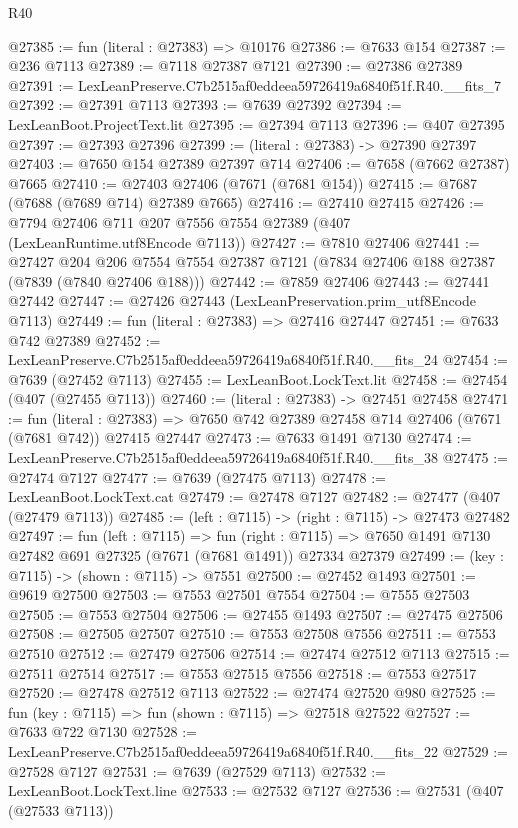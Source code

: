 \begin{lexlean}{R40}
\begin{coremodule}
@27385 := fun (literal : @27383) => @10176
@27386 := @7633 @154
@27387 := @236 @7113
@27389 := @7118 @27387 @7121
@27390 := @27386 @27389
@27391 := LexLeanPreserve.C7b2515af0eddeea59726419a6840f51f.R40.__fits_7
@27392 := @27391 @7113
@27393 := @7639 @27392
@27394 := LexLeanBoot.ProjectText.lit
@27395 := @27394 @7113
@27396 := @407 @27395
@27397 := @27393 @27396
@27399 := (literal : @27383) -> @27390 @27397
@27403 := @7650 @154 @27389 @27397 @714
@27406 := @7658 (@7662 @27387) @7665
@27410 := @27403 @27406 (@7671 (@7681 @154))
@27415 := @7687 (@7688 (@7689 @714) @27389 @7665)
@27416 := @27410 @27415
@27426 := @7794 @27406 @711 @207 @7556 @7554 @27389 (@407 (LexLeanRuntime.utf8Encode @7113))
@27427 := @7810 @27406
@27441 := @27427
    @204
    @206
    @7554
    @7554
    @27387
    @7121
    (@7834 @27406 @188 @27387 (@7839 (@7840 @27406 @188)))
@27442 := @7859 @27406
@27443 := @27441 @27442
@27447 := @27426 @27443 (LexLeanPreservation.prim_utf8Encode @7113)
@27449 := fun (literal : @27383) => @27416 @27447
@27451 := @7633 @742 @27389
@27452 := LexLeanPreserve.C7b2515af0eddeea59726419a6840f51f.R40.__fits_24
@27454 := @7639 (@27452 @7113)
@27455 := LexLeanBoot.LockText.lit
@27458 := @27454 (@407 (@27455 @7113))
@27460 := (literal : @27383) -> @27451 @27458
@27471 := fun (literal : @27383) =>
  @7650 @742 @27389 @27458 @714 @27406 (@7671 (@7681 @742)) @27415 @27447
@27473 := @7633 @1491 @7130
@27474 := LexLeanPreserve.C7b2515af0eddeea59726419a6840f51f.R40.__fits_38
@27475 := @27474 @7127
@27477 := @7639 (@27475 @7113)
@27478 := LexLeanBoot.LockText.cat
@27479 := @27478 @7127
@27482 := @27477 (@407 (@27479 @7113))
@27485 := (left : @7115) -> (right : @7115) -> @27473 @27482
@27497 := fun (left : @7115) =>
  fun (right : @7115) => @7650 @1491 @7130 @27482 @691 @27325 (@7671 (@7681 @1491)) @27334 @27379
@27499 := (key : @7115) -> (shown : @7115) -> @7551
@27500 := @27452 @1493
@27501 := @9619 @27500
@27503 := @7553 @27501 @7554
@27504 := @7555 @27503
@27505 := @7553 @27504
@27506 := @27455 @1493
@27507 := @27475 @27506
@27508 := @27505 @27507
@27510 := @7553 @27508 @7556
@27511 := @7553 @27510
@27512 := @27479 @27506
@27514 := @27474 @27512 @7113
@27515 := @27511 @27514
@27517 := @7553 @27515 @7556
@27518 := @7553 @27517
@27520 := @27478 @27512 @7113
@27522 := @27474 @27520 @980
@27525 := fun (key : @7115) => fun (shown : @7115) => @27518 @27522
@27527 := @7633 @722 @7130
@27528 := LexLeanPreserve.C7b2515af0eddeea59726419a6840f51f.R40.__fits_22
@27529 := @27528 @7127
@27531 := @7639 (@27529 @7113)
@27532 := LexLeanBoot.LockText.line
@27533 := @27532 @7127
@27536 := @27531 (@407 (@27533 @7113))

\end{coremodule}
\end{lexlean}
